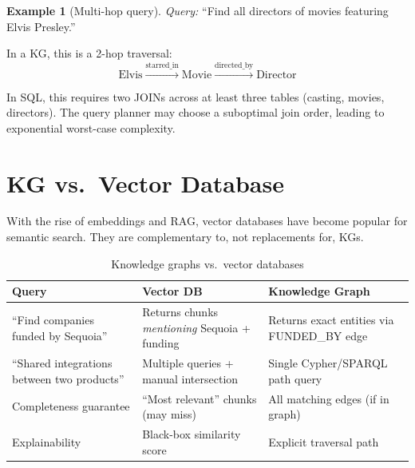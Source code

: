 \documentclass[11pt,a4paper,oneside,openany]{book}
\theoremstyle{definition}
\newtheorem{example}{Example}[chapter]
\theoremstyle{plain}
\theoremstyle{remark}
\begin{document}
\begin{example}[Multi-hop query]
	\label{ex:multihop}
	\emph{Query:} ``Find all directors of movies featuring Elvis Presley.''

	In a KG, this is a 2-hop traversal:
	$$\text{Elvis} \xrightarrow{\text{starred\_in}} \text{Movie} \xrightarrow{\text{directed\_by}} \text{Director}$$

	In SQL, this requires two JOINs across at least three tables (casting, movies, directors). The query planner may choose a suboptimal join order, leading to exponential worst-case complexity.
\end{example}

\section{KG vs.\ Vector Database}\label{sec:kg-vs-vector}

With the rise of embeddings and RAG, vector databases have become popular for semantic search. They are complementary to, not replacements for, KGs.

\begin{table}[h]
	\centering
	\caption{Knowledge graphs vs.\ vector databases}
	\label{tab:kg-vs-vector}
	\begin{tabular}{lp{6cm}p{6cm}}
		\toprule
		Query                                        & Vector DB                                          & Knowledge Graph                                     \\
		\midrule
		``Find companies funded by Sequoia''         & Returns chunks \emph{mentioning} Sequoia + funding & Returns exact entities via \textsc{FUNDED\_BY} edge \\
		``Shared integrations between two products'' & Multiple queries + manual intersection             & Single Cypher/SPARQL path query                     \\
		Completeness guarantee                       & ``Most relevant'' chunks (may miss)                & All matching edges (if in graph)                    \\
		Explainability                               & Black-box similarity score                         & Explicit traversal path                             \\
		\bottomrule
	\end{tabular}
\end{table}
\end{document}

